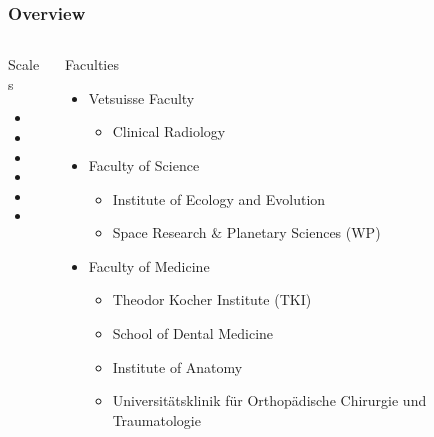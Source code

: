 \documentclass[aspectratio=169]{beamer}
\begin{document}
\begin{frame}
	\frametitle{Overview}
	\begin{columns}
		\begin{column}{0.309\linewidth}
			Scales
			\begin{itemize}
				\item {}%
				\normalsize\item \huge{}
				\normalsize\item \huge{}%
                \normalsize\item \huge{}%
				\normalsize\item \huge{}%
				\normalsize\item \huge{}
			\end{itemize}
		\end{column}
		\begin{column}{0.618\linewidth}
			Faculties
			\begin{itemize}
				\item Vetsuisse Faculty
				\begin{itemize}
				    \item Clinical Radiology
				\end{itemize}
				\item Faculty of Science
				\begin{itemize}
					\item Institute of Ecology and Evolution
					\item Space Research \& Planetary Sciences (WP)
				\end{itemize}	
				\item Faculty of Medicine
				\begin{itemize}
					\item Theodor Kocher Institute (TKI)
					\item School of Dental Medicine
					\item Institute of Anatomy
					\item Universitätsklinik für Orthopädische Chirurgie und Traumatologie
				\end{itemize}
			\end{itemize}
		\end{column}
	\end{columns}
\end{frame}
\end{document}
